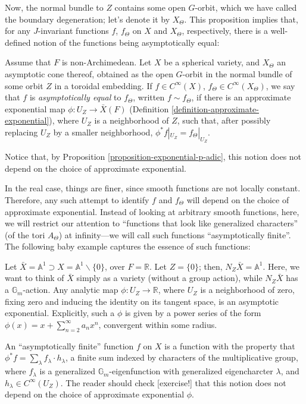 Now, the normal bundle to $Z$ contains some open $G$-orbit, which we have called the boundary degeneration; let's denote it by $X_\Theta$. This proposition implies that, for any $J$-invariant functions $f$, $f_\Theta$ on $X$ and $X_\Theta$, respectively, there is a well-defined notion of the functions being asymptotically equal:

\begin{definition}
 \label{definition-asymptotically-equal-padic}
Assume that $F$ is non-Archimedean. Let $X$ be a spherical variety, and $X_\Theta$ an asymptotic cone thereof, obtained as the open $G$-orbit in the normal bundle of some orbit $Z$ in a toroidal embedding. If $f\in C^\infty(X)$, $f_\Theta\in C^\infty(X_\Theta)$, we say that $f$ is {\it asymptotically equal} to $f_\Theta$, written $f\sim f_\Theta$, if there is an approximate exponential map $\phi: U_Z\to \bar X(F)$ (Definition \ref{definition-approximate-exponential}), where $U_Z$ is a neighborhood of $Z$, such that, after possibly replacing $U_Z$ by a smaller neighborhood, $\phi^* f|_{U_Z} = f_\Theta|_{U_Z}$.
\end{definition}

Notice that, by Proposition \ref{proposition-exponential-p-adic}, this notion does not depend on the choice of approximate exponential.

In the real case, things are finer, since smooth functions are not locally constant. Therefore, any such attempt to identify $f$ and $f_\Theta$ will depend on the choice of approximate exponential. Instead of looking at arbitrary smooth functions, here, we will restrict our attention to ``functions that look like generalized characters'' (of the tori $A_\Theta$) at infinity---we will call such functions ``asymptotically finite''. The following baby example captures the essence of such functions:

\begin{example}
 \label{example-real-asymptotics-baby}
Let $\bar X = \mathbb A^1 \supset X=\mathbb A^1\smallsetminus\{0\}$, over $F=\mathbb R$. Let $Z=\{0\}$; then, $N_Z \bar X = \mathbb A^1$. Here, we want to think of $\bar X$ simply as a variety (without a group action), while $N_Z \bar X$ has a $\mathbb G_m$-action. Any analytic map $\phi: U_Z\to \mathbb R$, where $U_Z$ is a neighborhood of zero, fixing zero and inducing the identity on its tangent space, is an asymptotic exponential. Explicitly, such a $\phi$ is given by a power series of the form $\phi(x) = x + \sum_{n=2}^\infty a_n x^n$, convergent within some radius. 

An ``asymptotically finite'' function $f$ on $X$ is a function with the property that $\phi^* f = \sum_\lambda f_\lambda \cdot h_\lambda$, a finite sum indexed by characters of the multiplicative group, where $f_\lambda$ is a generalized $\mathbb G_m$-eigenfunction with generalized eigencharcter $\lambda$, and $h_\lambda \in C^\infty(U_Z)$. The reader should check [exercise!] that this notion does not depend on the choice of approximate exponential $\phi$.
\end{example}

